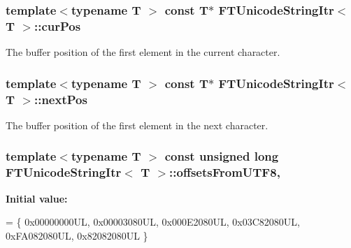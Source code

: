 \subsubsection[{\texorpdfstring{cur\+Pos}{curPos}}]{\setlength{\rightskip}{0pt plus 5cm}template$<$typename T $>$ const T$\ast$ {\bf F\+T\+Unicode\+String\+Itr}$<$ T $>$\+::cur\+Pos\hspace{0.3cm}{\ttfamily [private]}}\hypertarget{class_f_t_unicode_string_itr_a95fd553f6a2620484dbc20fd21d0ae4f}{}\label{class_f_t_unicode_string_itr_a95fd553f6a2620484dbc20fd21d0ae4f}
The buffer position of the first element in the current character. 
\subsubsection[{\texorpdfstring{next\+Pos}{nextPos}}]{\setlength{\rightskip}{0pt plus 5cm}template$<$typename T $>$ const T$\ast$ {\bf F\+T\+Unicode\+String\+Itr}$<$ T $>$\+::next\+Pos\hspace{0.3cm}{\ttfamily [private]}}\hypertarget{class_f_t_unicode_string_itr_a1de6b890c630933db1e550b5a44a2458}{}\label{class_f_t_unicode_string_itr_a1de6b890c630933db1e550b5a44a2458}
The buffer position of the first element in the next character. 
\subsubsection[{\texorpdfstring{offsets\+From\+U\+T\+F8}{offsetsFromUTF8}}]{\setlength{\rightskip}{0pt plus 5cm}template$<$typename T $>$ const unsigned long {\bf F\+T\+Unicode\+String\+Itr}$<$ T $>$\+::offsets\+From\+U\+T\+F8\hspace{0.3cm}{\ttfamily [static]}, {\ttfamily [private]}}\hypertarget{class_f_t_unicode_string_itr_a126c464a11581e184708210aa9d2752f}{}\label{class_f_t_unicode_string_itr_a126c464a11581e184708210aa9d2752f}
{\bfseries Initial value\+:}
\begin{DoxyCode}
= \{ 0x00000000UL, 0x00003080UL, 0x000E2080UL,
  0x03C82080UL, 0xFA082080UL, 0x82082080UL \}
\end{DoxyCode}
